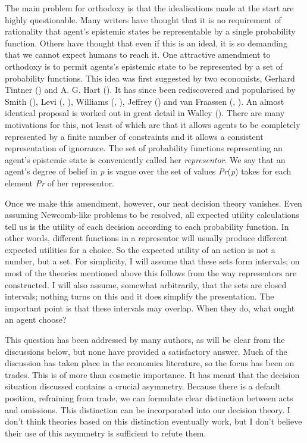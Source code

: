 \documentclass[
  11pt,
  letterpaper,
  DIV=11,
  numbers=noendperiod,
  twoside]{scrartcl}
\begin{document}
The main problem for orthodoxy is that the idealisations made at the
start are highly questionable. Many writers have thought that it is no
requirement of rationality that agent's epistemic states be
representable by a single probability function. Others have thought that
even if this is an ideal, it is so demanding that we cannot expect
humans to reach it. One attractive amendment to orthodoxy is to permit
agents's epistemic state to be represented by a set of probability
functions. This idea was first suggested by two economists, Gerhard
Tintner () and A. G. Hart
(). It has since been rediscovered and
popularised by Smith (), Levi
(, ), Williams
(, ),
Jeffrey () and van Fraassen
(,
). An almost identical proposal is
worked out in great detail in Walley ().
There are many motivations for this, not least of which are that it
allows agents to be completely represented by a finite number of
constraints and it allows a consistent representation of ignorance. The
set of probability functions representing an agent's epistemic state is
conveniently called her \emph{representor}. We say that an agent's
degree of belief in \emph{p} is vague over the set of values
\emph{Pr}(\emph{p}) takes for each element \emph{Pr} of her representor.

Once we make this amendment, however, our neat decision theory vanishes.
Even assuming Newcomb-like problems to be resolved, all expected utility
calculations tell us is the utility of each decision according to each
probability function. In other words, different functions in a
representor will usually produce different expected utilities for a
choice. So the expected utility of an action is not a number, but a set.
For simplicity, I will assume that these sets form intervals; on most of
the theories mentioned above this follows from the way representors are
constructed. I will also assume, somewhat arbitrarily, that the sets are
closed intervals; nothing turns on this and it does simplify the
presentation. The important point is that these intervals may overlap.
When they do, what ought an agent choose?

This question has been addressed by many authors, as will be clear from
the discussions below, but none have provided a satisfactory answer.
Much of the discussion has taken place in the economics literature, so
the focus has been on trades. This is of more than cosmetic importance.
It has meant that the decision situation discussed contains a crucial
asymmetry. Because there is a default position, refraining from trade,
we can formulate clear distinction between acts and omissions. This
distinction can be incorporated into our decision theory. I don't think
theories based on this distinction eventually work, but I don't believe
their use of this asymmetry is sufficient to refute them.
\end{document}
